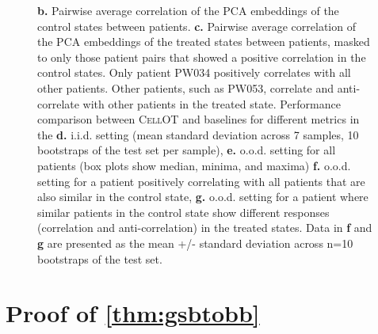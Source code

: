 \begin{figure}[p]
{     \textbf{b.} Pairwise average correlation of the PCA embeddings of the control states between patients. \textbf{c.} Pairwise average correlation of the PCA embeddings of the treated states between patients, masked to only those patient pairs that showed a positive correlation in the control states. Only patient PW034 positively correlates with all other patients. Other patients, such as PW053, correlate and anti-correlate with other patients in the treated state.
     Performance comparison between \textsc{CellOT} and baselines for different metrics in the \textbf{d.} i.i.d. setting (mean standard deviation across 7 samples, 10 bootstraps of the test set per sample),
     \textbf{e.} o.o.d. setting for all patients (box plots show median, minima, and maxima)
     \textbf{f.} o.o.d. setting for a patient positively correlating with all patients that are also similar in the control state,
     \textbf{g.} o.o.d. setting for a patient where similar patients in the control state show different responses (correlation and anti-correlation) in the treated states. Data in \textbf{f} and \textbf{g} are presented as the mean +/- standard deviation across n=10 bootstraps of the test set.
     }
     \label{fig:gbm_patients_iid_ood}
\end{figure}

\clearpage


\section{Proof of \cref{thm:gsbtobb}}
\label{app:gsbtobb}



